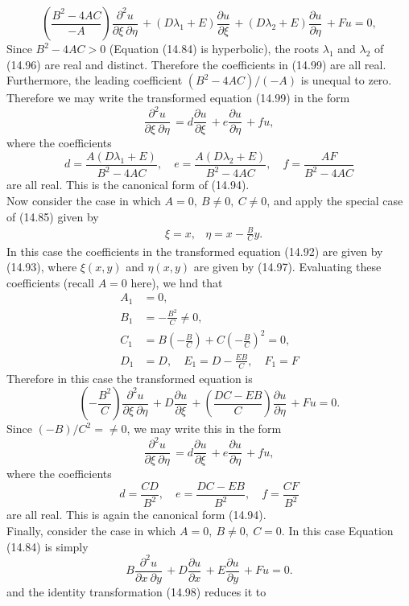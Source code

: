 \documentclass[11pt,a4paper, twoside]{report}
\newcommand{\pf}[2]{\dfrac{\partial #1}{\partial #2}\,}
\newcommand{\pfp}[4]{\dfrac{\partial^#4 #1}{\partial #2\ \partial #3}\,}
\begin{document}
	\begin{equation}\tag{14.99}
		\left(\frac{B^2 - 4AC}{-A}\right)\pfp{u}{\xi}{\eta}{2} + (D\lambda_1 + E)\pf{u}{\xi} + (D\lambda_2 + E)\pf{u}{\eta} + Fu = 0,
	\end{equation}
	Since $B^2 - 4AC > 0$ (Equation (14.84) is hyperbolic), the roots $\lambda_1$ and $\lambda_2$ of (14.96) are real and distinct. Therefore the coefficients in (14.99) are all real. Furthermore, the leading coefficient $(B^2 - 4AC)/(- A)$ is unequal to zero. Therefore we may write the transformed equation (14.99) in the form
	$$
	\pfp{u}{\xi}{\eta}{2} = d\pf{u}{\xi} + e\pf{u}{\eta} + fu,
	$$
	where the coefficients
	$$
	d = \frac{A(D\lambda_1 + E)}{B^2 - 4AC},\quad e = \frac{A(D\lambda_2 + E)}{B^2 - 4AC},\quad f = \frac{AF}{B^2 - 4AC}
	$$
	are all real. This is the canonical form of (14.94).\\
	Now consider the case in which $A = 0,\ B \neq 0,\ C \neq 0$, and apply the special case of (14.85) given by
	\begin{equation}
		\begin{aligned}
			& \xi = x,
			& \eta = x - \frac{B}{C}y.
		\end{aligned}
	\end{equation}
	In this case the coefficients in the transformed equation (14.92) are given by (14.93), where $\xi(x, y)$ and $\eta(x,y)$ are given by (14.97). Evaluating these coefficients (recall $A = 0$ here), we hnd that
	\begin{align*}
		A_1 &= 0,\\
		B_1 &= -\frac{B^2}{C} \neq 0,\\
		C_1 &= B\left(-\frac{B}{C}\right) + C\left(-\frac{B}{C}\right)^2 = 0,\\
		D_1 &= D,\quad E_1 = D - \frac{EB}{C},\quad F_1 = F
	\end{align*}
	Therefore in this case the transformed equation is
	$$
	\left(-\frac{B^2}{C}\right)\pfp{u}{\xi}{\eta}{2} + D\pf{u}{\xi} + \left(\frac{DC - EB}{C}\right)\pf{u}{\eta} + Fu = 0.
	$$
	Since $(-B)/C^2 = \neq 0$, we may write this in the form
	$$
	\pfp{u}{\xi}{\eta}{2} = d\pf{u}{\xi} + e\pf{u}{\eta} + fu,
	$$
	where the coefficients
	$$
	d = \frac{CD}{B^2},\quad e = \frac{DC - EB}{B^2},\quad f = \frac{CF}{B^2}
	$$
	are all real. This is again the canonical form (14.94).\\
	Finally, consider the case in which $A = 0,\ B \neq 0,\ C = 0$. In this case Equation (14.84) is simply
	$$
	B\pfp{u}{x}{y}{2} + D\pf{u}{x} + E\pf{u}{y} + Fu = 0.
	$$
	and the identity transformation (14.98) reduces it to
\end{document}
